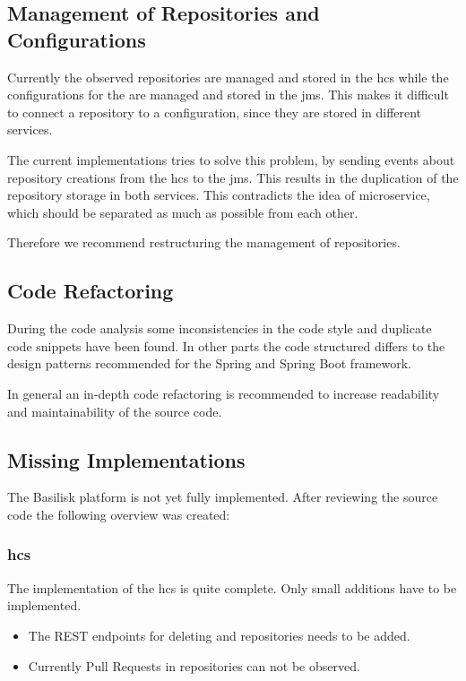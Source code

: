
\subsection{Management of Repositories and Configurations}
\label{sec:management_repo_config}
Currently the observed repositories are managed and stored in the \ac{hcs} while the configurations for the \tsp{} are managed and stored in the \ac{jms}.
This makes it difficult to connect a repository to a \ts{} configuration, since they are stored in different services.

The current implementations tries to solve this problem, by sending events about repository creations from the \ac{hcs} to the \ac{jms}.
This results in the duplication of the repository storage in both services.
This contradicts the idea of microservice, which should be separated as much as possible from each other.

Therefore we recommend restructuring the management of repositories.


\subsection{Code Refactoring}
\label{sec:code_refactor}
During the code analysis some inconsistencies in the code style and duplicate code snippets have been found.
In other parts the code structured differs to the design patterns recommended for the Spring and Spring Boot framework.

In general an in-depth code refactoring is recommended to increase readability and maintainability of the source code. 


\subsection{Missing Implementations}
The Basilisk platform is not yet fully implemented.
After reviewing the source code the following overview was created:

\subsubsection{\acl{hcs}}
The implementation of the \acl{hcs} is quite complete.
Only small additions have to be implemented.

\begin{itemize}
	\item The REST endpoints for deleting \gh{} and \dockh{} repositories needs to be added.
	
	\item Currently Pull Requests in \gh{} repositories can not be observed.
\end{itemize}


